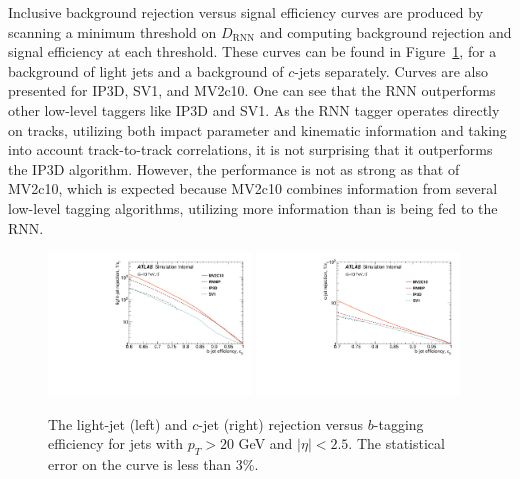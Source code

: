 Inclusive background rejection versus signal efficiency curves are produced by scanning a minimum threshold on $D_{\mathrm{RNN}}$ and computing background rejection and signal efficiency at each threshold. These curves can be found in Figure~\ref{fig:ROC}, for a background of light jets and a background of $c$-jets separately.  Curves are also presented for IP3D, SV1, and MV2c10. One can see that the RNN outperforms other low-level taggers like IP3D and SV1. As the RNN tagger operates directly on tracks, utilizing both impact parameter and kinematic information and taking into account track-to-track correlations, it is not surprising that it outperforms the IP3D algorithm.  However, the performance is not as strong as that of MV2c10, which is expected because MV2c10 combines information from several low-level tagging algorithms, utilizing more information than is being fed to the RNN.
\begin{figure}[htbp]
  \centering
 \includegraphics[width=0.48\textwidth]{figures/RNN/BL_ROC.pdf}
 \includegraphics[width=0.48\textwidth]{figures/RNN//BC_ROC.pdf}
\caption{The light-jet (left) and $c$-jet (right) rejection versus $b$-tagging efficiency for jets with $p_T > 20$ GeV and $|\eta|<2.5$. The statistical error on the curve is less than 3\%.}
  \label{fig:ROC}
\end{figure}

